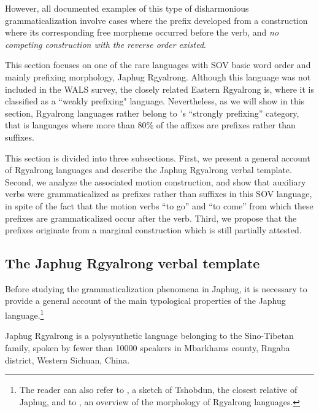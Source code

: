 \documentclass[oldfontcommands,twoside,a4paper,12pt]{article}
\begin{document}
However, all documented examples of this type of disharmonious grammaticalization  involve cases where the prefix developed from a construction where its corresponding free morpheme occurred before the verb, and \textit{no competing construction with the reverse order existed}. 

This section focuses on one of the rare languages with SOV basic word order and mainly prefixing morphology, Japhug Rgyalrong. Although this language was not included in the WALS survey, the closely related Eastern Rgyalrong is, where it is classified as a ``weakly prefixing" language. Nevertheless, as we will show in this section, Rgyalrong languages rather belong to \citealt{dryer11chapter26}'s ``strongly prefixing'' category, that is languages where more than 80\% of the affixes are prefixes rather than suffixes.

This section is divided into three subsections. First, we present a general account of Rgyalrong languages and describe the Japhug Rgyalrong verbal template. Second, we analyze the associated motion construction, and show that auxiliary verbs were grammaticalized as prefixes rather than suffixes in this SOV language, in spite of the fact that the motion verbs ``to go'' and ``to come'' from which these prefixes are grammaticalized occur after the verb. Third, we propose that the prefixes originate from a marginal construction which is still partially attested.


\subsection{The Japhug Rgyalrong verbal template} \label{subsec:template}
 Before studying the grammaticalization phenomena in Japhug, it is necessary to provide a general account of the main typological properties of the Japhug language.\footnote{The reader can also refer to \citet{jackson03caodeng}, a sketch of Tshobdun, the closest relative of Japhug, and to \citet{jackson03morpho}, an overview of the morphology of Rgyalrong languages.}
 
 
Japhug Rgyalrong is a polysynthetic language belonging to the Sino-Tibetan family, spoken by fewer than 10000 speakers in Mbarkhams county, Rngaba district, Western Sichuan, China.
\end{document}
